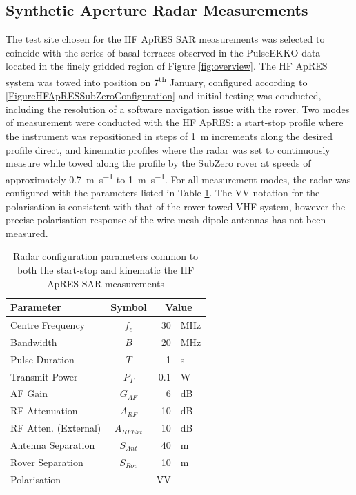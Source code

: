 \documentclass[a4paper,12pt]{article}
\begin{document}
\subsection{Synthetic Aperture Radar Measurements}
The test site chosen for the HF ApRES SAR measurements was selected to coincide
with the series of basal terraces observed in the PulseEKKO data located in the
finely gridded region of Figure \ref{fig:overview}.  The HF ApRES system was
towed into position on 7\textsuperscript{th} January, configured according to
\ref{FigureHFApRESSubZeroConfiguration} and initial testing was conducted,
including the resolution of a software navigation issue with the rover.  Two
modes of measurement were conducted with the HF ApRES: a start-stop profile
where the instrument was repositioned in steps of \SI{1}{\metre} increments
along the desired profile direct, and kinematic profiles where the radar was set
to continuously measure while towed along the profile by the SubZero rover at
speeds of approximately \SI{0.7}{\metre\per\second} to
\SI{1}{\metre\per\second}.  For all measurement modes, the radar was configured
with the parameters listed in Table \ref{TableHFApRESMeasurementParams}.  The 
VV notation for the polarisation is consistent with that of the rover-towed VHF
system, however the precise polarisation response of the wire-mesh dipole
antennas has not been measured.

\begin{table}[h]
  \centering\begin{tabular}{l c r l}
    \hline
    \rowcolor{gray!50}
    Parameter & Symbol & \multicolumn{2}{c}{Value} \\
    \hline
    Centre Frequency & $f_c$ & 30 & \si{\mega\hertz} \\
    Bandwidth & $B$ & 20 & \si{\mega\hertz} \\
    Pulse Duration & $T$ & 1 & \si{\second} \\
    Transmit Power & $P_T$ & 0.1 & \si{\watt} \\
    AF Gain & $G_{AF}$ & 6 & \si{\deci\bel} \\
    RF Attenuation & $A_{RF}$ & 10 & \si{\deci\bel} \\
    RF Atten. (External) & $A_{RFExt}$ & 10 &  \si{\deci\bel} \\
    Antenna Separation & $S_{Ant}$ & 40 & \si{\metre} \\
    Rover Separation & $S_{Rov}$ & 10 & \si{\metre} \\
    Polarisation & - & VV & - \\
    \hline
    
  \end{tabular}
  \caption{Radar configuration parameters common to both the start-stop and
  kinematic the HF ApRES SAR measurements}
  \label{TableHFApRESMeasurementParams}
\end{table}
\end{document}
